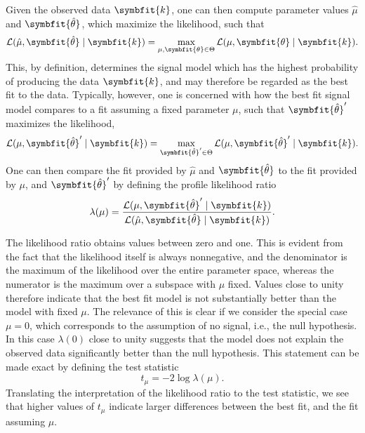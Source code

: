 \documentclass[b5paper, 10pt, twoside]{book}
\renewcommand{\vec}[1]{\symbfit{#1}}
\newcommand{\unitv}[1]{\symbfit{\hat{#1}}}
\begin{document}
Given the observed data $\vec{k}$, one can then compute parameter values $\hat{\mu}$ and $\unitv{\theta}$, which maximize the likelihood, such that
\begin{equation}
    \mathcal{L}(\hat{\mu},\unitv{\theta}\mid\vec{k})=\max_{\mu,\vec{\theta}\in\Theta}\mathcal{L}(\mu,\vec{\theta}\mid\vec{k}).
\end{equation}
This, by definition, determines the signal model which has the highest probability of producing the data $\vec{k}$, and may therefore be regarded as the best fit to the data. Typically, however, one is concerned with how the best fit signal model compares to a fit assuming a fixed parameter $\mu$, such that $\unitv{\theta}'$ maximizes the likelihood,
\begin{equation}
    \mathcal{L}(\mu,\unitv{\theta}'\mid\vec{k})=\max_{\unitv{\theta}'\in\Theta}\mathcal{L}(\mu,\unitv{\theta}'\mid\vec{k}).
\end{equation}
One can then compare the fit provided by $\hat{\mu}$ and $\unitv{\theta}$ to the fit provided by $\mu$, and $\unitv{\theta}'$ by defining the profile likelihood ratio
\begin{equation}
    \lambda(\mu)=\frac{\mathcal{L}(\mu,\unitv{\theta}'\mid\vec{k})}{\mathcal{L}(\hat{\mu},\unitv{\theta}\mid\vec{k})}.
\end{equation}

The likelihood ratio obtains values between zero and one. This is evident from the fact that the likelihood itself is always nonnegative, and the denominator is the maximum of the likelihood over the entire parameter space, whereas the numerator is the maximum over a subspace with $\mu$ fixed. Values close to unity therefore indicate that the best fit model is not substantially better than the model with fixed $\mu$. The relevance of this is clear if we consider the special case $\mu=0$, which corresponds to the assumption of no signal, i.e., the null hypothesis. In this case $\lambda(0)$ close to unity suggests that the model does not explain the observed data significantly better than the null hypothesis. This statement can be made exact by defining the test statistic
\begin{equation}
    t_\mu=-2\log\lambda(\mu).
\end{equation}
Translating the interpretation of the likelihood ratio to the test statistic, we see that higher values of $t_\mu$ indicate larger differences between the best fit, and the fit assuming $\mu$.
\end{document}
